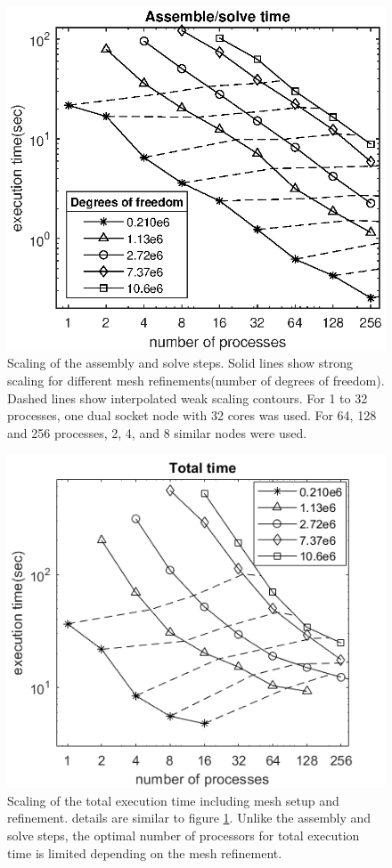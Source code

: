 \documentclass[twoside,leqno,twocolumn]{article}
\begin{document}
\begin{figure}
\label{fig:scaling1}
\includegraphics[width=\linewidth]{figures/solvescaling.eps}
\caption{Scaling of the assembly and solve steps. Solid lines show strong scaling for different mesh refinements(number of degrees of freedom). Dashed lines show interpolated weak scaling contours. For 1 to 32 processes, one dual socket node with 32 cores was used. For 64, 128 and 256 processes, 2, 4, and 8 similar nodes were used.}
\end{figure}
\begin{figure}
\label{fig:scaling2}
\includegraphics[width=\linewidth]{figures/totalscaling.png}
\caption{Scaling of the total execution time including mesh setup and refinement. details are similar to figure \ref{fig:scaling1}. Unlike the assembly and solve steps, the optimal number of processors for total execution time is limited depending on the mesh refinement.}
\end{figure}
\end{document}
